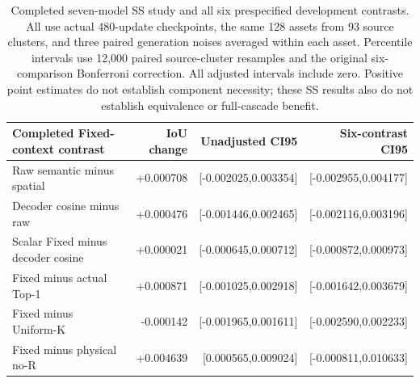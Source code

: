 \begin{table}[t]
\centering\small
\setlength{\tabcolsep}{4pt}
\begin{tabular}{lrrr}
\toprule
Completed Fixed-context contrast&IoU change&Unadjusted CI95&Six-contrast CI95\\
\midrule
Raw semantic minus spatial&+0.000708&[-0.002025,0.003354]&[-0.002955,0.004177]\\
Decoder cosine minus raw&+0.000476&[-0.001446,0.002465]&[-0.002116,0.003196]\\
Scalar Fixed minus decoder cosine&+0.000021&[-0.000645,0.000712]&[-0.000872,0.000973]\\
Fixed minus actual Top-1&+0.000871&[-0.001025,0.002918]&[-0.001642,0.003679]\\
Fixed minus Uniform-K&-0.000142&[-0.001965,0.001611]&[-0.002590,0.002233]\\
Fixed minus physical no-R&+0.004639&[0.000565,0.009024]&[-0.000811,0.010633]\\
\bottomrule
\end{tabular}
\caption{Completed seven-model SS study and all six prespecified development
contrasts. All use actual 480-update checkpoints, the same 128 assets from
93 source clusters, and three paired generation noises averaged within each
asset. Percentile intervals use 12,000 paired source-cluster resamples and
the original six-comparison Bonferroni correction. All adjusted intervals
include zero. Positive point estimates do not establish component necessity;
these SS results also do not establish equivalence or full-cascade benefit.}
\label{tab:completed-fixed-contrasts}
\end{table}
